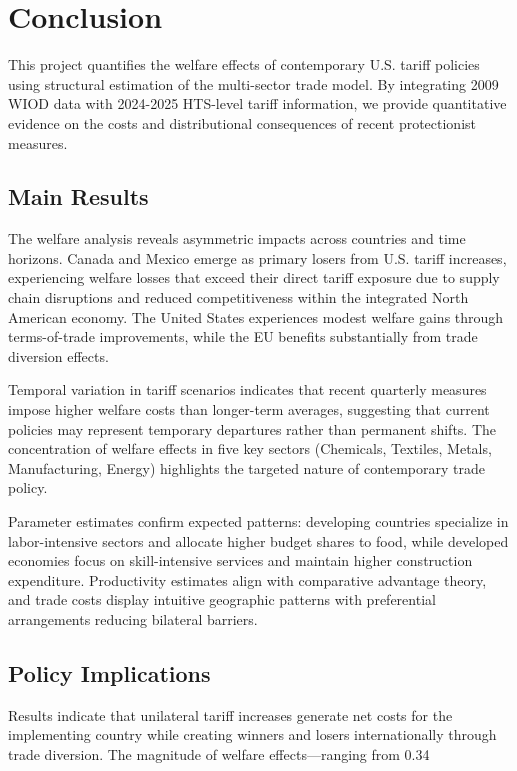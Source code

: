 \section{Conclusion}

This project quantifies the welfare effects of contemporary U.S. tariff policies using structural estimation of the \cite{costinot2012TheReviewofEconomicStudies} multi-sector trade model. By integrating 2009 WIOD data with 2024-2025 HTS-level tariff information, we provide quantitative evidence on the costs and distributional consequences of recent protectionist measures.

\subsection{Main Results}

The welfare analysis reveals asymmetric impacts across countries and time horizons. Canada and Mexico emerge as primary losers from U.S. tariff increases, experiencing welfare losses that exceed their direct tariff exposure due to supply chain disruptions and reduced competitiveness within the integrated North American economy. The United States experiences modest welfare gains through terms-of-trade improvements, while the EU benefits substantially from trade diversion effects.

Temporal variation in tariff scenarios indicates that recent quarterly measures impose higher welfare costs than longer-term averages, suggesting that current policies may represent temporary departures rather than permanent shifts. The concentration of welfare effects in five key sectors (Chemicals, Textiles, Metals, Manufacturing, Energy) highlights the targeted nature of contemporary trade policy.

Parameter estimates confirm expected patterns: developing countries specialize in labor-intensive sectors and allocate higher budget shares to food, while developed economies focus on skill-intensive services and maintain higher construction expenditure. Productivity estimates align with comparative advantage theory, and trade costs display intuitive geographic patterns with preferential arrangements reducing bilateral barriers.

\subsection{Policy Implications}

Results indicate that unilateral tariff increases generate net costs for the implementing country while creating winners and losers internationally through trade diversion. The magnitude of welfare effects—ranging from 0.34%

